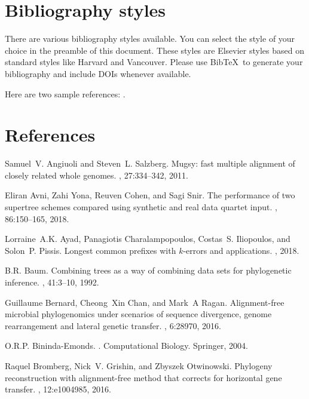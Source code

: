 \documentclass[review]{elsarticle}
\begin{document}
{\section{Bibliography styles}

There are various bibliography styles available. You can select the style of your choice in the preamble of this document. These styles are Elsevier styles based on standard styles like Harvard and Vancouver. Please use Bib\TeX\ to generate your bibliography and include DOIs whenever available.

Here are two sample references: \cite{Feynman1963118,Dirac1953888}.

\section*{References}

\begin{thebibliography}{10}

Samuel~V. Angiuoli and Steven~L. Salzberg.
\newblock Mugsy: fast multiple alignment of closely related whole genomes.
, 27:334--342, 2011.

Eliran Avni, Zahi Yona, Reuven Cohen, and Sagi Snir.
\newblock The performance of two supertree schemes compared using synthetic and
  real data quartet input.
, 86:150--165, 2018.

Lorraine~A.K. Ayad, Panagiotis Charalampopoulos, Costas~S. Iliopoulos, and
  Solon~P. Pissis.
\newblock Longest common prefixes with $k$-errors and applications.
, 2018.

B.R. Baum.
\newblock Combining trees as a way of combining data sets for phylogenetic
  inference.
, 41:3--10, 1992.

Guillaume Bernard, Cheong~Xin Chan, and Mark~A Ragan.
\newblock Alignment-free microbial phylogenomics under scenarios of sequence
  divergence, genome rearrangement and lateral genetic transfer.
, 6:28970, 2016.

O.R.P. Bininda-Emonds.
.
\newblock Computational Biology. Springer, 2004.

Raquel Bromberg, Nick~V. Grishin, and Zbyszek Otwinowski.
\newblock Phylogeny reconstruction with alignment-free method that corrects for
  horizontal gene transfer.
, 12:e1004985, 2016.


\end{thebibliography}}
\end{document}
